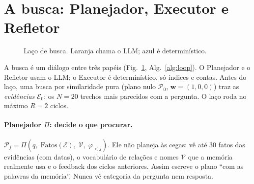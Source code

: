 \documentclass[10pt,twocolumn]{article}
\theoremstyle{definition}
\newcommand{\Pl}{\mathcal{P}}
\newcommand{\E}{\mathcal{E}}
\begin{document}
\section{A busca: Planejador, Executor e Refletor}
\label{sec:busca}

\begin{figure}[t]
\centering
{}
\caption{Laço de busca. Laranja chama o LLM; azul é determinístico.}
\label{fig:loop}
\vspace{-3mm}
\end{figure}

A busca é um diálogo entre três papéis (Fig.~\ref{fig:loop},
Alg.~\ref{alg:loop}). O Planejador e o Refletor usam o LLM; o Executor é
determinístico, só índices e contas. Antes do laço, uma busca por
similaridade pura (plano nulo $\Pl_0$, $\mathbf w=(1,0,0)$) traz as
\emph{evidências} $\E_0$: os $N=20$ trechos mais parecidos com a pergunta. O
laço roda no máximo $R=2$ ciclos.

\paragraph{Planejador $\Pi$: decide o que procurar.}
$\Pl_j=\Pi(q,\;\mathrm{Fatos}(\E),\;\mathcal V,\;\varphi_{<j})$. Ele não
planeja às cegas: vê até 30 fatos das evidências (com datas), o vocabulário de
relações e nomes $\mathcal V$ que a memória realmente usa e o feedback dos
ciclos anteriores. Assim escreve o plano ``com as palavras da memória''. Nunca
vê categoria da pergunta nem resposta.
\end{document}
